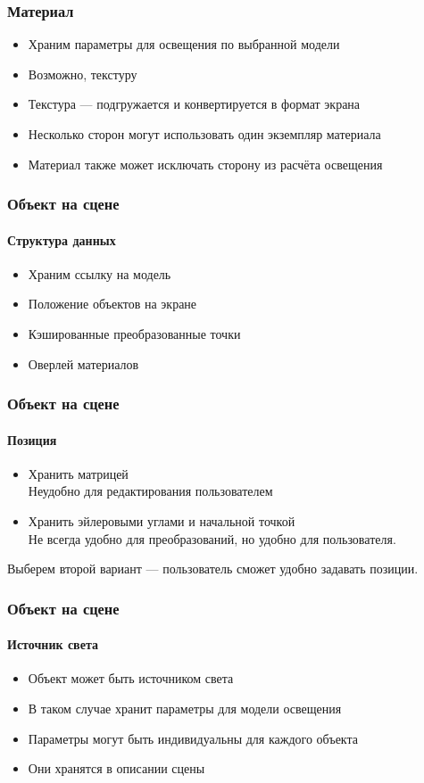 \documentclass{beamer}
\begin{document}
\begin{frame}
\frametitle{Материал}

\begin{itemize}
\item Храним параметры для освещения по выбранной модели
\item Возможно, текстуру
\item Текстура --- подгружается и конвертируется в формат экрана
\item Несколько сторон могут использовать один экземпляр материала
\item Материал также может исключать сторону из расчёта освещения
\end{itemize}
\end{frame}

\begin{frame}
\frametitle{Объект на сцене}
\framesubtitle{Структура данных}

\begin{itemize}
\item Храним ссылку на модель
\item Положение объектов на экране
\item Кэшированные преобразованные точки
\item Оверлей материалов
\end{itemize}
\end{frame}

\begin{frame}
\frametitle{Объект на сцене}
\framesubtitle{Позиция}

\begin{itemize}
\item Хранить матрицей \\
Неудобно для редактирования пользователем
\item Хранить эйлеровыми углами и начальной точкой \\
Не всегда удобно для преобразований, но удобно для пользователя.
\end{itemize}
Выберем второй вариант --- пользователь сможет удобно задавать позиции.
\end{frame}

\begin{frame}
\frametitle{Объект на сцене}
\framesubtitle{Источник света}

\begin{itemize}
\item Объект может быть источником света
\item В таком случае хранит параметры для модели освещения
\item Параметры могут быть индивидуальны для каждого объекта
\item Они хранятся в описании сцены
\end{itemize}
\end{frame}
\end{document}
